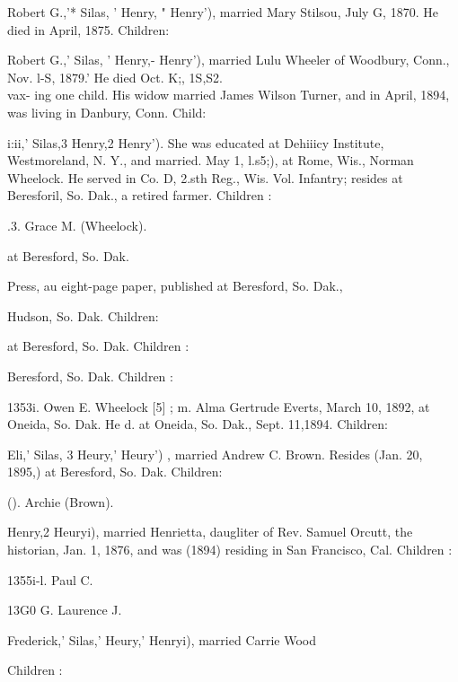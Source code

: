 \documentclass[oneside]{book}
\begin{document}
Robert G.,'* Silas, ' Henry, " Henry'), married Mary Stilsou, July 
G, 1870. He died in April, 1875. Children: 


Robert G.,' Silas, ' Henry,- Henry'), married Lulu Wheeler of 
Woodbury, Conn., Nov. l-S, 1879.' He died Oct. K;, 1S,S2. \\vax- 
ing one child. His widow married James Wilson Turner, and in 
April, 1894, was living in Danbury, Conn. Child: 


i:ii,' Silas,3 Henry,2 Henry'). She was educated at Dehiiicy 
Institute, Westmoreland, N. Y., and married. May 1, l.s5;), at 
Rome, Wis., Norman Wheelock. He served in Co. D, 2.sth 
Reg., Wis. Vol. Infantry; resides at Beresforil, So. Dak., a 
retired farmer. Children : 




.3. Grace M. (Wheelock). 


at Beresford, So. Dak. 



Press, au eight-page paper, published at Beresford, So. Dak., 



Hudson, So. Dak. Children: 




at Beresford, So. Dak. Children : 






Beresford, So. Dak. Children : 

1353i. Owen E. Wheelock [5] ; m. Alma Gertrude Everts, March 10, 
1892, at Oneida, So. Dak. He d. at Oneida, So. Dak., Sept. 
11,1894. Children: 



Eli,' Silas, 3 Heury,' Heury') , married Andrew C. Brown. Resides 
(Jan. 20, 1895,) at Beresford, So. Dak. Children: 





(). Archie (Brown). 

Henry,2 Heuryi), married Henrietta, daugliter of Rev. Samuel 
Orcutt, the historian, Jan. 1, 1876, and was (1894) residing in 
San Francisco, Cal. Children : 

1355i-l. Paul C. 





13G0 G. Laurence J. 

Frederick,' Silas,' Heury,' Henryi), married Carrie Wood 

Children : 
\end{document}
